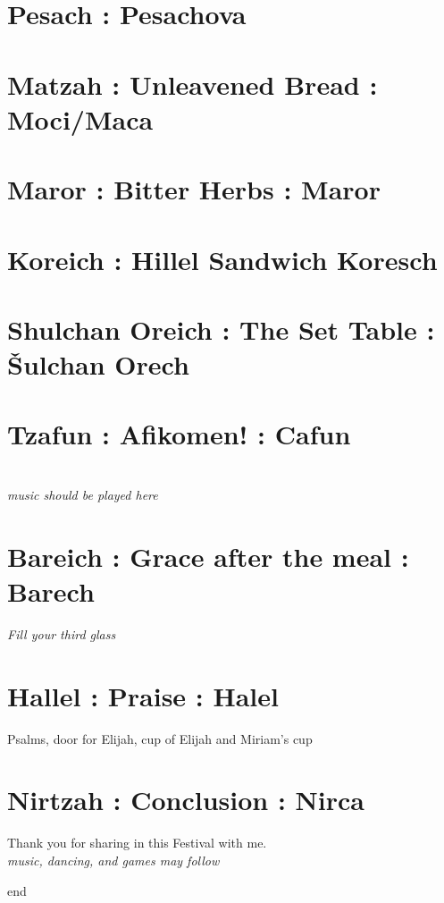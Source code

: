 \documentclass[a5paper,10pt]{memoir}
\begin{document}
\section{Pesach : Pesachova}

\section{Matzah : Unleavened Bread : Moci/Maca}
\HaMotzi
\Matzah

\section{Maror : Bitter Herbs : Maror}
\Maror

\section{Koreich : Hillel Sandwich Koresch}
\Koreich

\section{Shulchan Oreich : The Set Table : Šulchan Orech}

\section{Tzafun : Afikomen! : Cafun}
\\
\textit{music should be played here}

\section{Bareich : Grace after the meal : Barech}
\textit{Fill your third glass}\\
\Bareich
\Kaddeish

\section{Hallel : Praise : Halel}
Psalms, door for Elijah, cup of Elijah and Miriam’s cup

\Hallel
\Elijah
\Miriam
% 

\section{Nirtzah : Conclusion : Nirca}
\Nirtzah
% 
Thank you for sharing in this Festival with me.\\
\textit{music, dancing, and games may follow}
\begin{center}
	{end}
\end{center}
\end{document}
